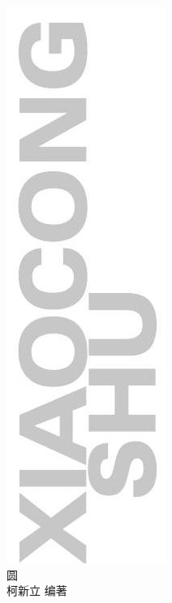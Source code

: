 \documentclass[10pt]{article}
\begin{document}
\includegraphics[max width=\textwidth, center]{2024_10_30_66b8e5e701da2093c133g-002(2)}\\
圆\\
柯新立 编著
\end{document}
